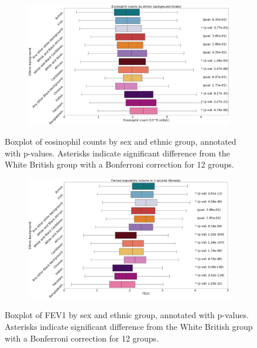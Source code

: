 \documentclass[12pt]{pnas-new}
\begin{document}
\begin{figure}
    \centering
    \begin{subfigure}{\textwidth}
    \includegraphics[width=\textwidth]{images/male_eosinophill_boxplot_annotated.pdf}
    \end{subfigure}
    \caption{Boxplot of eosinophil counts by sex and ethnic group, annotated with p-values. Asterisks indicate significant difference from the White British group with a Bonferroni correction for 12 groups.}
    \label{fig:supp_box_eosinophill_m}
\end{figure}

\begin{figure}
    \centering
    \begin{subfigure}{\textwidth}
    \includegraphics[width=\textwidth]{images/female_fev_boxplot_annotated.pdf}
    \end{subfigure}
    \caption{Boxplot of FEV1 by sex and ethnic group, annotated with p-values. Asterisks indicate significant difference from the White British group with a Bonferroni correction for 12 groups.}
    \label{fig:supp_box_fev_f}
\end{figure}
\end{document}
